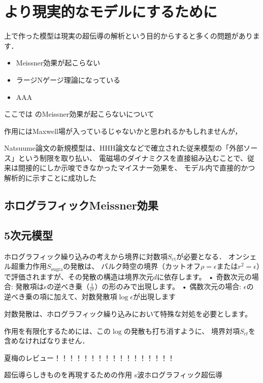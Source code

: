 \documentclass[b5paper,11pt,dvipdfmx]{jsarticle}
\numberwithin{equation}{section}
\theoremstyle{definition}
\begin{document}
\section{より現実的なモデルにするために}

上で作った模型は現実の超伝導の解析という目的からすると多くの問題があります．
\begin{itemize}
    \item Meissner効果が起こらない
    \item ラージNゲージ理論になっている
    \item AAA
\end{itemize}
ここでは
のMeissner効果が起こらないについて

作用にはMaxwell場が入っているじゃないかと思われるかもしれませんが，

Natsuume論文の新規模型は、HHH論文などで確立された従来模型の「外部ソース」という制限を取り払い、
電磁場のダイナミクスを直接組み込むことで、従来は間接的にしか示唆できなかったマイスナー効果を、
モデル内で直接的かつ解析的に示すことに成功した

\subsection{ホログラフィックMeissner効果}




\subsection{5次元模型}

ホログラフィック繰り込みの考えから境界に対数項$S_{\text{ct}}$が必要となる．
オンシェル超重力作用$S_{\text{sugra}}$の発散は、
バルク時空の境界（カットオフ$\rho = \epsilon$または$r^2 = \epsilon$）で評価されますが、その発散の構造は境界次元$d$に依存します。
• 奇数次元の場合: 発散項は$\epsilon$の逆べき乗（$\frac{1}{\epsilon^k}$）の形のみで出現します。
• 偶数次元の場合: $\epsilon$の逆べき乗の項に加えて、対数発散項$\log \epsilon$が出現します


対数発散は、ホログラフィック繰り込みにおいて特殊な対処を必要とします。

作用を有限化するためには、この$\log$の発散も打ち消すように、
境界対項$S_{ct}$を含めなければなりません\cite{deHaro00}．






夏梅のレビュー！！！！！！！！！！！！！！！！！

超伝導らしきものを再現するための作用
s波ホログラフィック超伝導
\end{document}
